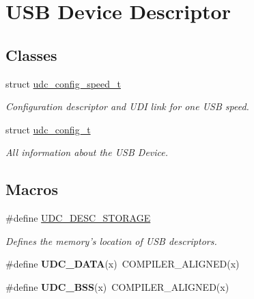 \hypertarget{group__udc__desc__group}{\section{U\-S\-B Device Descriptor}
\label{group__udc__desc__group}
}
\subsection*{Classes}
\begin{DoxyCompactItemize}
\item 
struct \hyperlink{structudc__config__speed__t}{udc\-\_\-config\-\_\-speed\-\_\-t}
\begin{DoxyCompactList}\small\item\em Configuration descriptor and U\-D\-I link for one U\-S\-B speed. \end{DoxyCompactList}\item 
struct \hyperlink{structudc__config__t}{udc\-\_\-config\-\_\-t}
\begin{DoxyCompactList}\small\item\em All information about the U\-S\-B Device. \end{DoxyCompactList}\end{DoxyCompactItemize}
\subsection*{Macros}
\begin{DoxyCompactItemize}
\item 
\#define \hyperlink{group__udc__desc__group_gae086959cec07a2e71ab069e25a51764f}{U\-D\-C\-\_\-\-D\-E\-S\-C\-\_\-\-S\-T\-O\-R\-A\-G\-E}
\begin{DoxyCompactList}\small\item\em Defines the memory's location of U\-S\-B descriptors. \end{DoxyCompactList}\item 
\hypertarget{group__udc__desc__group_ga1659a2f0b429f07a985a8faaa3fb27b1}{\#define {\bfseries U\-D\-C\-\_\-\-D\-A\-T\-A}(x)~C\-O\-M\-P\-I\-L\-E\-R\-\_\-\-A\-L\-I\-G\-N\-E\-D(x)}\label{group__udc__desc__group_ga1659a2f0b429f07a985a8faaa3fb27b1}

\item 
\hypertarget{group__udc__desc__group_ga198e5cdf3367aa0b35821417b7ede0b2}{\#define {\bfseries U\-D\-C\-\_\-\-B\-S\-S}(x)~C\-O\-M\-P\-I\-L\-E\-R\-\_\-\-A\-L\-I\-G\-N\-E\-D(x)}\label{group__udc__desc__group_ga198e5cdf3367aa0b35821417b7ede0b2}

\end{DoxyCompactItemize}
